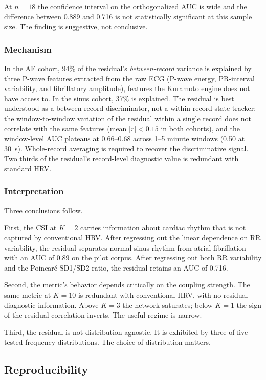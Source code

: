 \documentclass[11pt]{article}
\begin{document}
At $n = 18$ the confidence interval on the orthogonalized AUC is wide
and the difference between 0.889 and 0.716 is not statistically
significant at this sample size. The finding is suggestive, not
conclusive.

\subsubsection{Mechanism}

In the AF cohort, 94\% of the residual's \emph{between-record} variance
is explained by three P-wave features extracted from the raw ECG
(P-wave energy, PR-interval variability, and fibrillatory amplitude),
features the Kuramoto engine does not have access to. In the sinus
cohort, 37\% is explained. The residual is best understood as a
between-record discriminator, not a within-record state tracker: the
window-to-window variation of the residual within a single record does
not correlate with the same features (mean $|r| < 0.15$ in both
cohorts), and the window-level AUC plateaus at 0.66--0.68 across
1--5 minute windows (0.50 at 30~s). Whole-record averaging is required
to recover the discriminative signal. Two thirds of the residual's
record-level diagnostic value is redundant with standard HRV.

\subsubsection{Interpretation}

Three conclusions follow.

First, the CSI at $K = 2$ carries information about cardiac rhythm that
is not captured by conventional HRV. After regressing out the linear
dependence on RR variability, the residual separates normal sinus
rhythm from atrial fibrillation with an AUC of 0.89 on the pilot
corpus. After regressing out both RR variability and the Poincar\'e
SD1/SD2 ratio, the residual retains an AUC of 0.716.

Second, the metric's behavior depends critically on the coupling
strength. The same metric at $K = 10$ is redundant with conventional
HRV, with no residual diagnostic information. Above $K = 3$ the network
saturates; below $K = 1$ the sign of the residual correlation inverts.
The useful regime is narrow.

Third, the residual is not distribution-agnostic. It is exhibited by
three of five tested frequency distributions. The choice of distribution
matters.

\subsection{Reproducibility}
\end{document}
